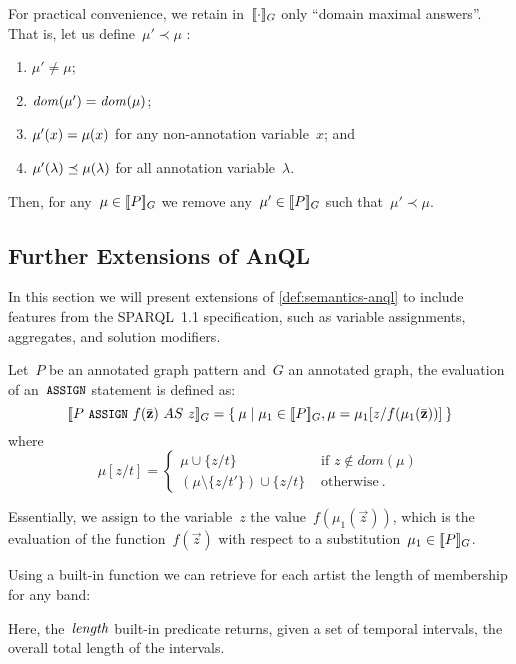 \nd For practical convenience, we retain in~$[\![ \cdot ]\!]_{G}$ only ``domain maximal answers''. That is, let us
define~$\mu' \prec \mu$ \iff:
% 
\begin{enumerate}[label=(\roman*),noitemsep]
\item $\mu' \neq \mu$;
\item $\mathit{dom}\!\left(\mu'\right) = \mathit{dom}\!\left(\mu\right)$;
\item $\mathit{\mu'}\!\left(x\right) = \mathit{\mu}\!\left(x\right)$ for any non-annotation variable~$x$; and
\item $\mathit{\mu'}\!\left(\lambda\right) \preceq \mathit{\mu}\!\left(\lambda\right)$ for all annotation variable~$\lambda$.
\end{enumerate}
%
Then, for any~$\mu \in [\![ P ]\!]_{G}$ we remove any~$\mu' \in [\![ P ]\!]_{G}$ such that~$\mu' \prec \mu$.



\subsection{Further Extensions of AnQL}
\label{sec:asparql-aggregates}

In this section we will present extensions of \cref{def:semantics-anql} to include features from the SPARQL~1.1
specification, such as variable assignments, aggregates, and solution modifiers.



\begin{definition}
  \label{def:anql-assign}
  Let~$P$ be an annotated graph pattern and~$G$ an annotated graph, the evaluation of an~$\texttt{{\small ASSIGN}}$ statement is
  defined as:
    \[
    \eval{P\ \keyword{ASSIGN}\ f(\vec{z})\ AS\ z}_{G} = \set{ \mu \mid \mu_1 \in \eval{P}_{G},\mu =\mu_1[z/f(\mu_{1}(\vec{z}))]}
    \]
    \nd where
    \[
    \mu[z/t] = \left\{
    \begin{array}{ll}
      \mu \cup \{z/t\} &\textrm{ if } z \not\in \mathit{dom}(\mu)\\
      \left(\mu \setminus \{z/t'\}\right) \cup \{z/t\} &\textrm{ otherwise} \ .
    \end{array}
    \right.
    \]
    
\end{definition}

\nd Essentially, we assign to the variable~$z$ the value~$f(\mu_{1}(\vec{z}))$, which is the evaluation of the function~$f(\vec{z})$ with respect to a substitution~$\mu_{1} \in [\![ P ]\!]_{G}$.

\begin{example}
  \label{exx3}
  Using a built-in function we can retrieve for each artist the length of membership for any band:
  
  \nd Here, the~$\mathit{length}$ built-in predicate returns, given a set of temporal intervals, the overall total
  length of the intervals.
\end{example}


